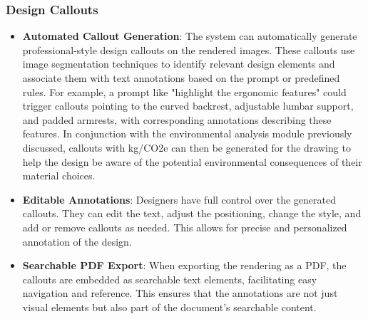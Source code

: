 \documentclass[12pt]{report}
\begin{document}
\subsubsection{Design Callouts}
\begin{itemize}
\item \textbf{Automated Callout Generation}: The system can automatically generate professional-style design callouts on the rendered images. These callouts use image segmentation techniques to identify relevant design elements and associate them with text annotations based on the prompt or predefined rules. For example, a prompt like "highlight the ergonomic features" could trigger callouts pointing to the curved backrest, adjustable lumbar support, and padded armrests, with corresponding annotations describing these features. In conjunction with the environmental analysis module previously discussed, callouts with kg/CO2e can then be generated for the drawing to help the design be aware of the potential environmental consequences of their material choices.
\item \textbf{Editable Annotations}: Designers have full control over the generated callouts. They can edit the text, adjust the positioning, change the style, and add or remove callouts as needed. This allows for precise and personalized annotation of the design.
\item \textbf{Searchable PDF Export}: When exporting the rendering as a PDF, the callouts are embedded as searchable text elements, facilitating easy navigation and reference. This ensures that the annotations are not just visual elements but also part of the document's searchable content.
\end{itemize}
\end{document}
